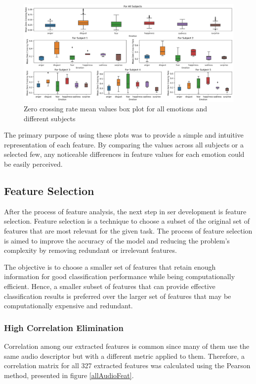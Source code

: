 \begin{figure}[H]
	\centering
	\includegraphics[width=\linewidth]{figs/4_1_traditional/mean_zcr_box_plot.png}
	\caption{Zero crossing rate mean values box plot for all emotions and different subjects}
	\label{fig:zcrMeanBoxPlot}
\end{figure}

The primary purpose of using these plots was to provide a simple and intuitive representation of each feature. By comparing the values across all subjects or a selected few, any noticeable differences in feature values for each emotion could be easily perceived.

\subsection{Feature Selection}

After the process of feature analysis, the next step in \ac{ser} development is feature selection. Feature selection is a technique to choose a subset of the original set of features that are most relevant for the given task. The process of feature selection is aimed to improve the accuracy of the model and reducing the problem's complexity by removing redundant or irrelevant features. 

The objective is to choose a smaller set of features that retain enough information for good classification performance while being computationally efficient. Hence, a smaller subset of features that can provide effective classification results is preferred over the larger set of features that may be computationally expensive and redundant.

\subsubsection{High Correlation Elimination}

Correlation among our extracted features is common since many of them use the same audio descriptor but with a different metric applied to them. Therefore, a correlation matrix for all 327 extracted features was calculated using the Pearson method, presented in figure \ref{allAudioFeat}.

